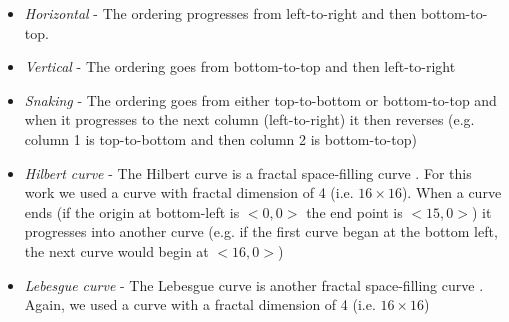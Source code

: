 \documentclass[12pt]{report}
\begin{document}
\begin{itemize}
\item \textit{Horizontal} - The ordering progresses from left-to-right and then bottom-to-top.
\item \textit{Vertical} - The ordering goes from bottom-to-top and then left-to-right
\item \textit{Snaking} - The ordering goes from either top-to-bottom or bottom-to-top and when it progresses to the next column (left-to-right) it then reverses (e.g. column 1 is top-to-bottom and then column 2 is bottom-to-top)
\item \textit{Hilbert curve} - The Hilbert curve is a fractal space-filling curve \cite{hilbert1891ueber}.  For this work we used a curve with fractal dimension of 4 (i.e. $16 \times 16$). When a curve ends (if the origin at bottom-left is $<0,0>$ the end point is $<15,0>$) it progresses into another curve (e.g. if the first curve began at the bottom left, the next curve would begin at $<16,0>$)
\item \textit{Lebesgue curve} - The Lebesgue curve is another fractal space-filling curve \cite{morton1966computer}.  Again, we used a curve with a fractal dimension of 4 (i.e. $16 \times 16$)

\end{itemize}
\end{document}
